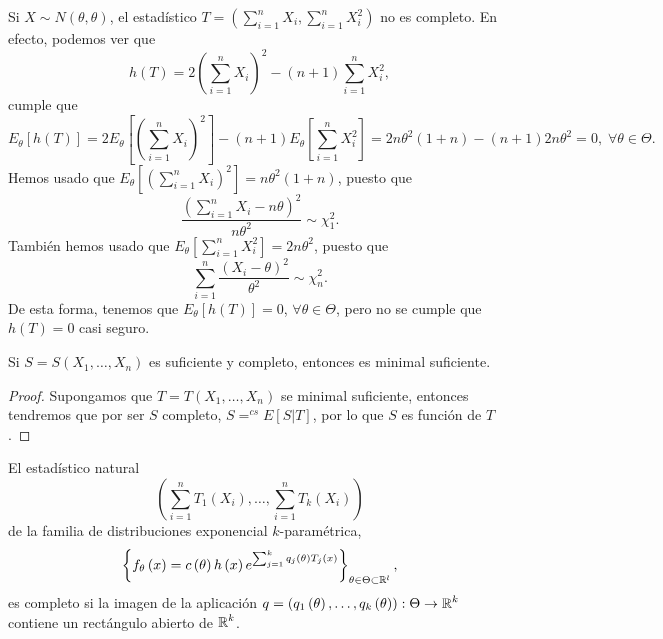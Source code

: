 \begin{eg}
Si $\displaystyle X \sim N\left(\theta, \theta\right) $, el estadístico $\displaystyle T = \left(\sum^{n}_{i=1}X_{i}, \sum^{n}_{i=1}X_{i}^{2}\right) $ no es completo. En efecto, podemos ver que 
\[h\left(T\right)=2\left(\sum^{n}_{i = 1}X_{i}\right)^{2}-\left(n+1\right)\sum^{n}_{i = 1}X_{i}^{2} ,\]
cumple que 
\[E_{\theta}\left[h\left(T\right)\right] = 2E_{\theta}\left[\left(\sum^{n}_{i = 1}X_{i}\right)^{2}\right] -\left(n+1\right)E_{\theta}\left[\sum^{n}_{i = 1}X_{i}^{2}\right] =2n\theta^{2}\left(1 + n\right)-\left(n+1\right)2n\theta^{2} = 0, \; \forall \theta \in \Theta.\]
Hemos usado que $\displaystyle E_{\theta} \left[\left(\sum^{n}_{i = 1}X_{i}\right)^{2}\right]=n\theta^{2}\left(1 + n\right)$, puesto que 
\[\frac{\left(\sum^{n}_{i = 1}X_{i}-n\theta\right)^{2}}{n\theta^{2}}\sim\chi_{1}^{2} .\]
También hemos usado que $\displaystyle E_{\theta}\left[\sum^{n}_{i = 1}X_{i}^{2}\right] =2n\theta^{2} $, puesto que 
\[\sum^{n}_{i = 1}\frac{\left(X_{i}-\theta\right)^{2}}{\theta^{2}}\sim \chi^{2}_{n} .\]
De esta forma, tenemos que $\displaystyle E_{\theta}\left[h\left(T\right)\right] =0 $, $\displaystyle \forall \theta \in \Theta $, pero no se cumple que $\displaystyle h\left(T\right)=0 $ casi seguro.
\end{eg}
\begin{prop}
Si $\displaystyle S = S\left(X_{1}, \ldots, X_{n}\right) $ es suficiente y completo, entonces es minimal suficiente. 
\end{prop}
\begin{proof}
	Supongamos que $\displaystyle T = T\left(X_{1}, \ldots, X_{n}\right) $ se minimal suficiente, entonces tendremos que por ser $\displaystyle S $ completo, $\displaystyle S =^{cs}E\left[S|T\right]  $, por lo que $\displaystyle S $ es función de $\displaystyle T $. 
\end{proof}
\begin{theorem}
El estadístico natural  
\[\left(\sum^{n}_{i = 1}T_{1}\left(X_{i}\right), \ldots, \sum^{n}_{i = 1}T_{k}\left(X_{i}\right)\right) \]
de la familia de distribuciones exponencial $\displaystyle k $-paramétrica, 
\[ \left\{ f_{\theta}\left(x\right)=c\left(\theta\right) h\left(x\right)e^{\sum^{k}_{j = 1}q_{j}\left(\theta\right)T_{j}\left(x\right)}\right\} _{\theta\in \Theta\subset \mathbb{R}^{l}} ,\]
es completo si la imagen de la aplicación $\displaystyle q = \left(q_{1}\left(\theta\right), \ldots, q_{k}\left(\theta\right)\right) : \Theta \to \mathbb{R}^{k} $ contiene un rectángulo abierto de $\displaystyle \mathbb{R}^{k} $. 
\end{theorem}
